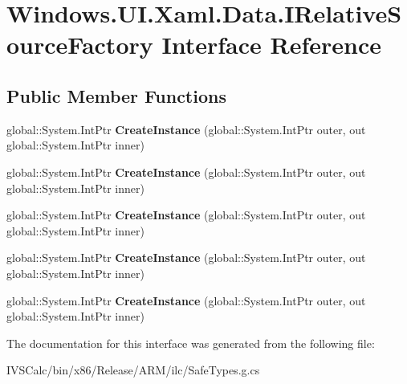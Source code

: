 \hypertarget{interface_windows_1_1_u_i_1_1_xaml_1_1_data_1_1_i_relative_source_factory}{}\section{Windows.\+U\+I.\+Xaml.\+Data.\+I\+Relative\+Source\+Factory Interface Reference}
\label{interface_windows_1_1_u_i_1_1_xaml_1_1_data_1_1_i_relative_source_factory}
\subsection*{Public Member Functions}
\begin{DoxyCompactItemize}
\item 
\mbox{\label{interface_windows_1_1_u_i_1_1_xaml_1_1_data_1_1_i_relative_source_factory_a25fe0ca74bbc6816aa4cc494bf3312b8}} 
global\+::\+System.\+Int\+Ptr {\bfseries Create\+Instance} (global\+::\+System.\+Int\+Ptr outer, out global\+::\+System.\+Int\+Ptr inner)
\item 
\mbox{\label{interface_windows_1_1_u_i_1_1_xaml_1_1_data_1_1_i_relative_source_factory_a25fe0ca74bbc6816aa4cc494bf3312b8}} 
global\+::\+System.\+Int\+Ptr {\bfseries Create\+Instance} (global\+::\+System.\+Int\+Ptr outer, out global\+::\+System.\+Int\+Ptr inner)
\item 
\mbox{\label{interface_windows_1_1_u_i_1_1_xaml_1_1_data_1_1_i_relative_source_factory_a25fe0ca74bbc6816aa4cc494bf3312b8}} 
global\+::\+System.\+Int\+Ptr {\bfseries Create\+Instance} (global\+::\+System.\+Int\+Ptr outer, out global\+::\+System.\+Int\+Ptr inner)
\item 
\mbox{\label{interface_windows_1_1_u_i_1_1_xaml_1_1_data_1_1_i_relative_source_factory_a25fe0ca74bbc6816aa4cc494bf3312b8}} 
global\+::\+System.\+Int\+Ptr {\bfseries Create\+Instance} (global\+::\+System.\+Int\+Ptr outer, out global\+::\+System.\+Int\+Ptr inner)
\item 
\mbox{\label{interface_windows_1_1_u_i_1_1_xaml_1_1_data_1_1_i_relative_source_factory_a25fe0ca74bbc6816aa4cc494bf3312b8}} 
global\+::\+System.\+Int\+Ptr {\bfseries Create\+Instance} (global\+::\+System.\+Int\+Ptr outer, out global\+::\+System.\+Int\+Ptr inner)
\end{DoxyCompactItemize}


The documentation for this interface was generated from the following file\+:\begin{DoxyCompactItemize}
\item 
I\+V\+S\+Calc/bin/x86/\+Release/\+A\+R\+M/ilc/Safe\+Types.\+g.\+cs\end{DoxyCompactItemize}
